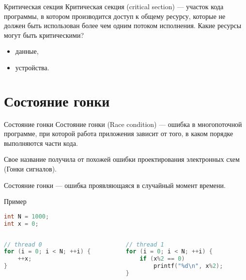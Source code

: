 \begin{frame}{Критическая секция}
Критическая секция (\abbr critical section) --- участок кода программы, в
котором производится доступ к общему ресурсу, которые не должен быть использован
более чем одним потоком исполнения.
\vfill\pause
Какие ресурсы могут быть критическими?
\pause
\begin{itemize}
    \item данные,
    \pause
    \item устройства.
\end{itemize}
\end{frame}

\section{Состояние гонки}

\begin{frame}{Состояние гонки}
Состояние гонки (\abbr Race condition) --- ошибка в многопоточной программе, при которой работа приложения зависит от того, в каком порядке выполняются части кода.
\vspace*{0.5cm}

Свое название получила от похожей ошибки проектирования электронных схем (Гонки сигналов).
\vspace*{0.5cm}

Состояние гонки --- ошибка проявляющаяся в случайный момент времени.
\end{frame}

\begin{frame}[fragile]{Пример}
\begin{lstlisting}[language=C++,basicstyle=\ttfamily,keywordstyle=\color{blue},basicstyle=\scriptsize]
int N = 1000;
int x = 0;
\end{lstlisting}

\begin{columns}[t]
    \begin{column}[T]{0.45\textwidth}
    \begin{lstlisting}[language=C++,basicstyle=\ttfamily,keywordstyle=\color{blue},basicstyle=\scriptsize]
// thread 0
for (i = 0; i < N; ++i) {
    ++x;
}
    \end{lstlisting}
    \end{column}
    \begin{column}[T]{0.45\textwidth}
    \begin{lstlisting}[language=C++,basicstyle=\ttfamily,keywordstyle=\color{blue},basicstyle=\scriptsize]
// thread 1
for (i = 0; i < N; ++i) {
    if (x%2 == 0)
        printf("%d\n", x%2);
}
    \end{lstlisting}
    \end{column}
\end{columns}
\end{frame}

